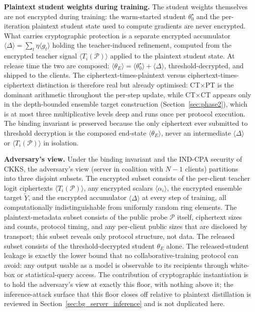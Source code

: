 \par\noindent\textbf{Plaintext student weights during training.} The student weights themselves are not encrypted during training: the warm-started student $\theta_0^\star$ and the per-iteration plaintext student state used to compute gradients are never encrypted. What carries cryptographic protection is a separate encrypted accumulator $\langle\Delta\rangle = \sum_t \eta \langle g_t\rangle$ holding the teacher-induced refinement, computed from the encrypted teacher signal $\langle T_i(\mathcal P)\rangle$ applied to the plaintext student state. At release time the two are composed: $\langle\theta_E\rangle = \langle\theta_0^\star\rangle + \langle\Delta\rangle$, threshold-decrypted, and shipped to the clients. The ciphertext-times-plaintext versus ciphertext-times-ciphertext distinction is therefore real but already optimised: CT$\times$PT is the dominant arithmetic throughout the per-step update, while CT$\times$CT appears only in the depth-bounded ensemble target construction (Section~\ref{sec:phase2}), which is at most three multiplicative levels deep and runs once per protocol execution. The binding invariant is preserved because the only ciphertext ever submitted to threshold decryption is the composed end-state $\langle\theta_E\rangle$, never an intermediate $\langle\Delta\rangle$ or $\langle T_i(\mathcal P)\rangle$ in isolation.

\par\noindent\textbf{Adversary's view.} Under the binding invariant and the IND-CPA security of CKKS, the adversary's view (server in coalition with $N{-}1$ clients) partitions into three disjoint subsets. The encrypted subset consists of the per-client teacher logit ciphertexts $\langle T_i(\mathcal P)\rangle$, any encrypted scalars $\langle\alpha_i\rangle$, the encrypted ensemble target $\widetilde Y$, and the encrypted accumulator $\langle\Delta\rangle$ at every step of training, all computationally indistinguishable from uniformly random ring elements. The plaintext-metadata subset consists of the public probe $\mathcal P$ itself, ciphertext sizes and counts, protocol timing, and any per-client public sizes that are disclosed by transport; this subset reveals only protocol structure, not data. The released subset consists of the threshold-decrypted student $\theta_E$ alone. The released-student leakage is exactly the lower bound that no collaborative-training protocol can avoid: any output usable as a model is observable to its recipients through white-box or statistical-query access. The contribution of cryptographic instantiation is to hold the adversary's view at exactly this floor, with nothing above it; the inference-attack surface that this floor closes off relative to plaintext distillation is reviewed in Section~\ref{sec:bg_server_inference} and is not duplicated here.

